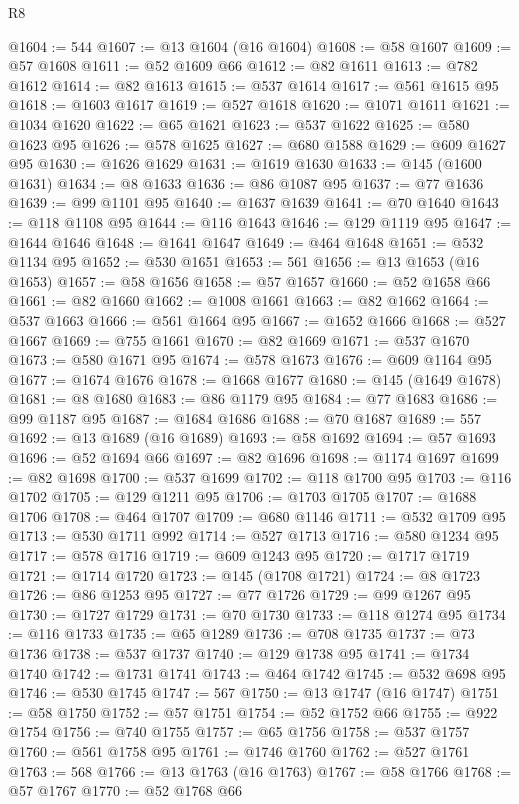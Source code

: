 \begin{lexlean}{R8}
\begin{coremodule}
@1604 := 544
@1607 := @13 @1604 (@16 @1604)
@1608 := @58 @1607
@1609 := @57 @1608
@1611 := @52 @1609 @66
@1612 := @82 @1611
@1613 := @782 @1612
@1614 := @82 @1613
@1615 := @537 @1614
@1617 := @561 @1615 @95
@1618 := @1603 @1617
@1619 := @527 @1618
@1620 := @1071 @1611
@1621 := @1034 @1620
@1622 := @65 @1621
@1623 := @537 @1622
@1625 := @580 @1623 @95
@1626 := @578 @1625
@1627 := @680 @1588
@1629 := @609 @1627 @95
@1630 := @1626 @1629
@1631 := @1619 @1630
@1633 := @145 (@1600 @1631)
@1634 := @8 @1633
@1636 := @86 @1087 @95
@1637 := @77 @1636
@1639 := @99 @1101 @95
@1640 := @1637 @1639
@1641 := @70 @1640
@1643 := @118 @1108 @95
@1644 := @116 @1643
@1646 := @129 @1119 @95
@1647 := @1644 @1646
@1648 := @1641 @1647
@1649 := @464 @1648
@1651 := @532 @1134 @95
@1652 := @530 @1651
@1653 := 561
@1656 := @13 @1653 (@16 @1653)
@1657 := @58 @1656
@1658 := @57 @1657
@1660 := @52 @1658 @66
@1661 := @82 @1660
@1662 := @1008 @1661
@1663 := @82 @1662
@1664 := @537 @1663
@1666 := @561 @1664 @95
@1667 := @1652 @1666
@1668 := @527 @1667
@1669 := @755 @1661
@1670 := @82 @1669
@1671 := @537 @1670
@1673 := @580 @1671 @95
@1674 := @578 @1673
@1676 := @609 @1164 @95
@1677 := @1674 @1676
@1678 := @1668 @1677
@1680 := @145 (@1649 @1678)
@1681 := @8 @1680
@1683 := @86 @1179 @95
@1684 := @77 @1683
@1686 := @99 @1187 @95
@1687 := @1684 @1686
@1688 := @70 @1687
@1689 := 557
@1692 := @13 @1689 (@16 @1689)
@1693 := @58 @1692
@1694 := @57 @1693
@1696 := @52 @1694 @66
@1697 := @82 @1696
@1698 := @1174 @1697
@1699 := @82 @1698
@1700 := @537 @1699
@1702 := @118 @1700 @95
@1703 := @116 @1702
@1705 := @129 @1211 @95
@1706 := @1703 @1705
@1707 := @1688 @1706
@1708 := @464 @1707
@1709 := @680 @1146
@1711 := @532 @1709 @95
@1713 := @530 @1711 @992
@1714 := @527 @1713
@1716 := @580 @1234 @95
@1717 := @578 @1716
@1719 := @609 @1243 @95
@1720 := @1717 @1719
@1721 := @1714 @1720
@1723 := @145 (@1708 @1721)
@1724 := @8 @1723
@1726 := @86 @1253 @95
@1727 := @77 @1726
@1729 := @99 @1267 @95
@1730 := @1727 @1729
@1731 := @70 @1730
@1733 := @118 @1274 @95
@1734 := @116 @1733
@1735 := @65 @1289
@1736 := @708 @1735
@1737 := @73 @1736
@1738 := @537 @1737
@1740 := @129 @1738 @95
@1741 := @1734 @1740
@1742 := @1731 @1741
@1743 := @464 @1742
@1745 := @532 @698 @95
@1746 := @530 @1745
@1747 := 567
@1750 := @13 @1747 (@16 @1747)
@1751 := @58 @1750
@1752 := @57 @1751
@1754 := @52 @1752 @66
@1755 := @922 @1754
@1756 := @740 @1755
@1757 := @65 @1756
@1758 := @537 @1757
@1760 := @561 @1758 @95
@1761 := @1746 @1760
@1762 := @527 @1761
@1763 := 568
@1766 := @13 @1763 (@16 @1763)
@1767 := @58 @1766
@1768 := @57 @1767
@1770 := @52 @1768 @66

\end{coremodule}
\end{lexlean}
